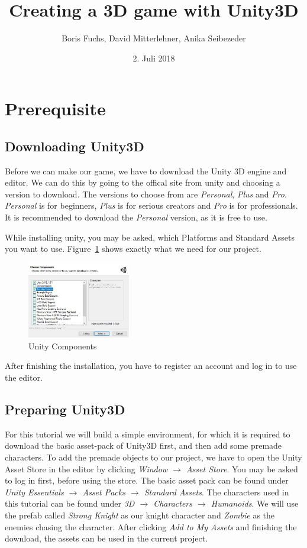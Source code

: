 \documentclass[12pt, a4paper, titlepage]{article}
\title{Creating a 3D game with Unity3D}
\date{2. Juli 2018}
\author{Boris Fuchs, David Mitterlehner, Anika Seibezeder}
\begin{document}
\maketitle
\tableofcontents 

\section{Prerequisite}
\subsection{Downloading Unity3D}
Before we can make our game, we have to download the Unity 3D engine and editor. We can do this by going to the offical site from unity \cite{b4} and choosing a version to download. The versions to choose from are \emph{Personal}, \emph{Plus} and \emph{Pro}. \emph{Personal} is for beginners, \emph{Plus} is for serious creators and \emph{Pro} is for professionals. It is recommended to download the \emph{Personal} version, as it is free to use.

While installing unity, you may be asked, which Platforms and Standard Assets you want to use. Figure~\ref{fig:downloading_unity_components} shows exactly what we need for our project.

\begin{figure}[htbp]
  \centering
  \includegraphics[width=0.4\textwidth]{pictures/downloading_unity_components}
  \caption{Unity Components}
  \label{fig:downloading_unity_components}
\end{figure}

After finishing the installation, you have to register an account and log in to use the editor.

\subsection{Preparing Unity3D}
For this tutorial we will build a simple environment, for which it is required to download the basic asset-pack of Unity3D first, and then add some premade characters. To add the premade objects to our project, we have to open the Unity Asset Store in the editor by clicking \emph{Window $\rightarrow$ Asset Store}. You may be asked to log in first, before using the store.
The basic asset pack can be found under \emph{Unity Essentials $\rightarrow$ Asset Packs $\rightarrow$ Standard Assets}\cite{b7}. The characters used in this tutorial can be found under \emph{3D $\rightarrow$ Characters $\rightarrow$ Humanoids}. We will use the prefab called \emph{Strong Knight}\cite{b5} as our knight character and \emph{Zombie}\cite{b6}  as the enemies chasing the character.
After clicking \emph{Add to My Assets} and finishing the download, the assets can be used in the current project.
\end{document}
